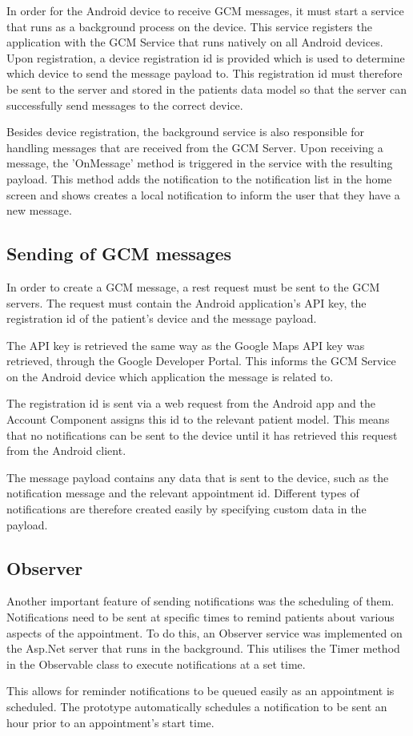 In order for the Android device to receive GCM messages, it must start a service that runs as a background process on the device. This service registers the application with the GCM Service that runs natively on all Android devices. Upon registration, a device registration id is provided which is used to determine which device to send the message payload to. This registration id must therefore be sent to the server and stored in the patients data model so that the server can successfully send messages to the correct device.

Besides device registration, the background service is also responsible for handling messages that are received from the GCM Server. Upon receiving a message, the 'OnMessage' method is triggered in the service with the resulting payload. This method adds the notification to the notification list in the home screen and shows creates a local notification to inform the user that they have a new message.

\subsection{Sending of GCM messages}

In order to create a GCM message, a rest request must be sent to the GCM servers. The request must contain the Android application's API key, the registration id of the patient's device and the message payload.

The API key is retrieved the same way as the Google Maps API key was retrieved, through the Google Developer Portal. This informs the GCM Service on the Android device which application the message is related to.

The registration id is sent via a web request from the Android app and the Account Component assigns this id to the relevant patient model. This means that no notifications can be sent to the device until it has retrieved this request from the Android client.

The message payload contains any data that is sent to the device, such as the notification message and the relevant appointment id. Different types of notifications are therefore created easily by specifying custom data in the payload.

\subsection{Observer}

Another important feature of sending notifications was the scheduling of them. Notifications need to be sent at specific times to remind patients about various aspects of the appointment. To do this, an Observer service was implemented on the Asp.Net server that runs in the background. This utilises the Timer method in the Observable class to execute notifications at a set time.

This allows for reminder notifications to be queued easily as an appointment is scheduled. The prototype automatically schedules a notification to be sent an hour prior to an appointment's start time.

